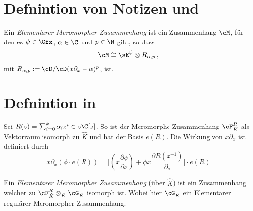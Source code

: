 \section{Defnintion von Notizen und \cite[Cor 5.2.6]{sabbah_cimpa90}}
\begin{defn}
Ein \emph{Elementarer Meromorpher Zusammenhang} ist ein Zusammenhang $\cM$, für
den es $\psi \in \Cfx$, $\alpha\in\C$ und $p\in \N$ gibt, so dass
\[
\cM\cong \sE^{\psi}\otimes R_{\alpha,p}\,,
\]
mit $R_{\alpha,p}:=\cD/\cD(x\partial_x-\alpha)^p$, ist.
\begin{comment}
Sind die Regulär?
\end{comment}
\end{defn}

\section{Defnintion in \cite{sabbah_cimpa90}}
\begin{comment}
in \cite{sabbah_cimpa90} Teil 5.4.4 Seite 34
\end{comment}
\begin{defn}
Sei $R(z)=\sum_{i=0}^k\alpha_iz^i\in z\C[z]$.
So ist der Meromorphe Zusammenhang $\cF_{\hat K}^R$ als Vektorraum isomorph zu
$\hat K$ und hat der Basis $e(R)$.
Die Wirkung von $x\partial_x$ ist definiert durch
\[
x\partial_x(\phi\cdot e(R))=\Big[ (x\frac{\partial \phi}{\partial x}) 
  +\phi x \frac{\partial R(x^{-1})}{\partial_x} \Big]\cdot e(R)
\]
\begin{comment}
This means that $e(R)$ plays the role of $\exp R(x^{-1})$.
\end{comment}
\end{defn}
\begin{defn}
Ein \emph{Elementarer Meromorpher Zusammenhang} (über $\hat K$) ist ein Zusammenhang
welcher zu 
$\cF_{\hat K}^R\otimes_{\hat K} \cG_{\hat K}$
isomorph ist. Wobei hier $\cG_{\hat K}$ ein Elementarer regulärer Meromorpher
Zusammenhang.
\end{defn}

